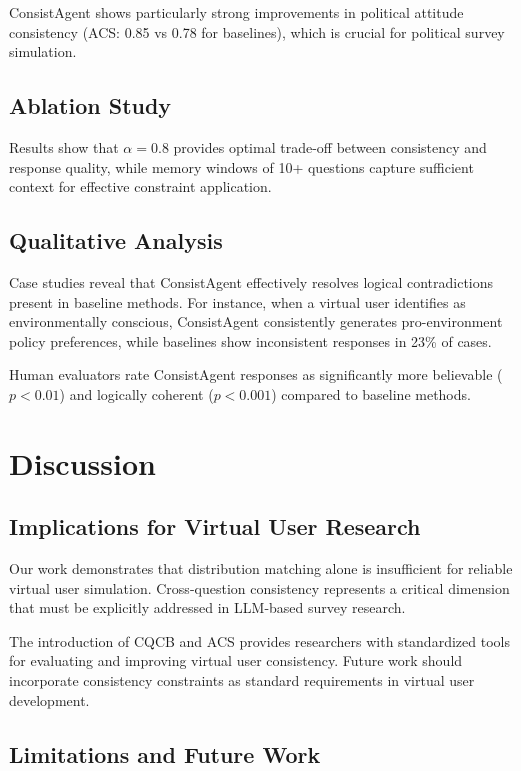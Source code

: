 \documentclass[sigconf, anonymous]{acmart}
\begin{document}
ConsistAgent shows particularly strong improvements in political attitude consistency (ACS: 0.85 vs 0.78 for baselines), which is crucial for political survey simulation.

\subsection{Ablation Study}

Results show that $\alpha = 0.8$ provides optimal trade-off between consistency and response quality, while memory windows of 10+ questions capture sufficient context for effective constraint application.

\subsection{Qualitative Analysis}

Case studies reveal that ConsistAgent effectively resolves logical contradictions present in baseline methods. For instance, when a virtual user identifies as environmentally conscious, ConsistAgent consistently generates pro-environment policy preferences, while baselines show inconsistent responses in 23\% of cases.

Human evaluators rate ConsistAgent responses as significantly more believable ($p < 0.01$) and logically coherent ($p < 0.001$) compared to baseline methods.

\section{Discussion}

\subsection{Implications for Virtual User Research}

Our work demonstrates that distribution matching alone is insufficient for reliable virtual user simulation. Cross-question consistency represents a critical dimension that must be explicitly addressed in LLM-based survey research.

The introduction of CQCB and ACS provides researchers with standardized tools for evaluating and improving virtual user consistency. Future work should incorporate consistency constraints as standard requirements in virtual user development.

\subsection{Limitations and Future Work}
\end{document}
